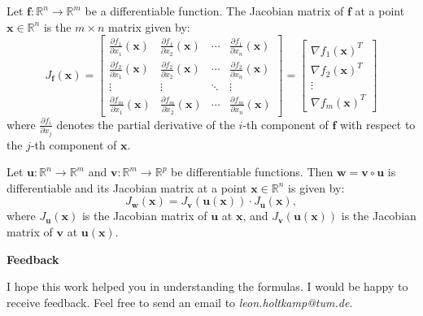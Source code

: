 \documentclass{article}
\begin{document}
\begin{definition*}
    Let \(\mathbf{f} : \mathbb{R}^n \to \mathbb{R}^m\) be a differentiable function. 
    The Jacobian matrix of \(\mathbf{f}\) at a point \(\mathbf{x} \in \mathbb{R}^n\) 
    is the \(m \times n\) matrix given by:
    \[
        J_{\mathbf{f}}(\mathbf{x}) = 
        \begin{bmatrix}
            \frac{\partial f_1}{\partial x_1}(\mathbf{x}) & \frac{\partial f_1}{\partial x_2}(\mathbf{x}) 
            & \cdots & \frac{\partial f_1}{\partial x_n}(\mathbf{x}) \\
            \frac{\partial f_2}{\partial x_1}(\mathbf{x}) & \frac{\partial f_2}{\partial x_2}(\mathbf{x}) 
            & \cdots & \frac{\partial f_2}{\partial x_n}(\mathbf{x}) \\
            \vdots & \vdots & \ddots & \vdots \\
            \frac{\partial f_m}{\partial x_1}(\mathbf{x}) & \frac{\partial f_m}{\partial x_2}(\mathbf{x}) 
            & \cdots & \frac{\partial f_m}{\partial x_n}(\mathbf{x})
        \end{bmatrix} = 
        \begin{bmatrix}
            \nabla f_1(\mathbf{x})^T \\
            \nabla f_2(\mathbf{x})^T \\
            \vdots \\
            \nabla f_m(\mathbf{x})^T
        \end{bmatrix}
    \]
    where \(\frac{\partial f_i}{\partial x_j}\) denotes the partial derivative of 
    the \(i\)-th component of \(\mathbf{f}\) with respect to the \(j\)-th component of \(\mathbf{x}\).
\end{definition*}

\begin{theorem*}
    Let \(\mathbf{u} : \mathbb{R}^n \to \mathbb{R}^m\) and \(\mathbf{v} : \mathbb{R}^m \to \mathbb{R}^p\)
    be differentiable functions. Then \(\mathbf{w} = \mathbf{v} \circ \mathbf{u}\) is differentiable
    and its Jacobian matrix at a point \(\mathbf{x} \in 
    \mathbb{R}^n\) is given by:
        \[
            J_{\mathbf{w}}(\mathbf{x}) = J_{\mathbf{v}}(\mathbf{u}(\mathbf{x})) \cdot J_{\mathbf{u}}(\mathbf{x}),
        \]
    where \(J_{\mathbf{u}}(\mathbf{x})\) is the Jacobian matrix of \(\mathbf{u}\) at \(\mathbf{x}\), and 
    \(J_{\mathbf{v}}(\mathbf{u}(\mathbf{x}))\) is the Jacobian matrix of \(\mathbf{v}\) at \(\mathbf{u}(\mathbf{x})\).
\end{theorem*}

\vspace{0.3cm}
\noindent \large \textbf{Feedback}
\vspace{0.3cm}
\normalsize

I hope this work helped you in understanding the formulas. I would be happy to 
receive feedback. Feel free to send an email to \textit{leon.holtkamp@tum.de}.
\end{document}
